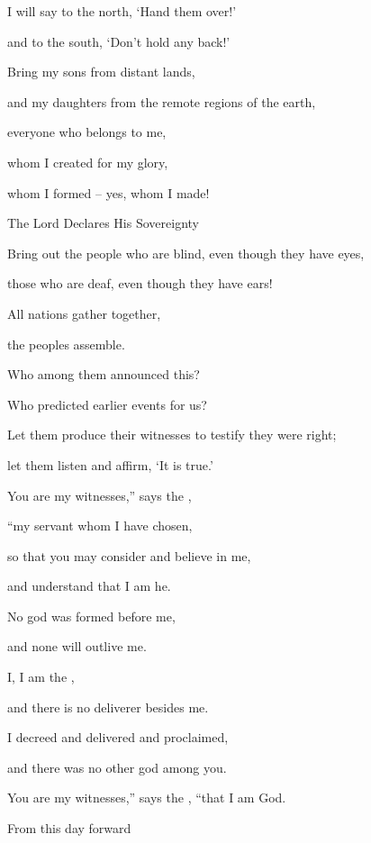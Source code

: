 {\par }{\Q {}I will say
to the north,
‘Hand
them over!’
\par }{\Q and to the south,
‘Don’t
hold
any back!’
\par }{\Q Bring
my sons
from distant
lands,
\par }{\Q and my daughters
from the remote
regions of the earth,
\par }{\Q {}everyone
who belongs
to me,
\par }{\Q whom I created
for my
glory,
\par }{\Q whom I formed
– yes,
whom I made!
\par }{\SH The Lord Declares His Sovereignty
\par }{\Q {}Bring out
the people
who are blind,
even though they have eyes,
\par }{\Q those who are deaf,
even though they have ears!
\par }{\Q {}All
nations
gather
together,
\par }{\Q the peoples
assemble.
\par }{\Q Who
among them announced
this?
\par }{\Q Who predicted
earlier
events for us?
\par }{\Q Let them produce
their witnesses
to testify they were right;
\par }{\Q let them listen
and affirm,
‘It is true.’
\par }{\Q {}You
are my witnesses,”
says
the {},
\par }{\Q “my servant
whom
I have chosen,
\par }{\Q so that
you may consider
and believe
in me,
\par }{\Q and understand
that
I
am he.
\par }{\Q No
god
was formed
before
me,
\par }{\Q and none
will outlive me.
\par }{\Q {}I,
I am
the {},
\par }{\Q and there is no
deliverer
besides me.
\par }{\Q {}I
decreed
and delivered
and proclaimed,
\par }{\Q and there was no
other
god among you.
\par }{\Q You
are my witnesses,”
says
the {}, “that I am
God.
\par }{\Q {}From this day
forward

\par }
